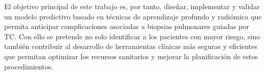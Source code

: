 El objetivo principal de este trabajo es, por tanto, diseñar, implementar y validar un modelo predictivo basado en técnicas de aprendizaje profundo y radiómica que permita anticipar complicaciones asociadas a biopsias pulmonares guiadas por TC. Con ello se pretende no solo identificar a los pacientes con mayor riesgo, sino también contribuir al desarrollo de herramientas clínicas más seguras y eficientes que permitan optimizar los recursos sanitarios y mejorar la planificación de estos procedimientos.

\endinput
